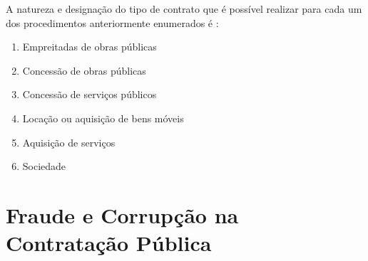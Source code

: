 
A natureza e designação do tipo de contrato que é possível realizar para cada um dos procedimentos anteriormente enumerados é : 

\begin{enumerate}
	\setlength\itemsep{.01cm}
	\item Empreitadas de obras públicas
	\item Concessão de obras públicas
	\item Concessão de serviços públicos
	\item Locação ou aquisição de bens móveis
	\item Aquisição de serviços
	\item Sociedade
\end{enumerate}



\section{Fraude e Corrupção na Contratação Pública}